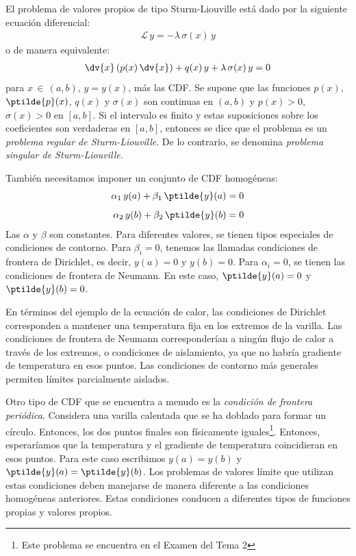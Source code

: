 El problema de valores propios de tipo Sturm-Liouville está dado por la siguiente ecuación diferencial:
\begin{align*}
\mathcal{L} \, y = - \lambda \, \sigma(x) \, y
\end{align*}
o de manera equivalente:
\begin{align}
\dv{x} \left( p(x) \, \dv{x} \right) + q(x) \, y + \lambda \, \sigma (x) \, y = 0
\label{eq:ecuacion_04_03}
\end{align}
para $x \, \in \, (a, b)$, $y = y (x)$, más las CDF. Se supone que las funciones $p (x)$, $\ptilde{p} (x)$, $q (x)$ y $\sigma (x)$ son continuas en $(a, b)$ y $p (x) > 0$, $\sigma (x) > 0$ en $[a , b]$. Si el intervalo es finito y estas suposiciones sobre los coeficientes son verdaderas en $[a, b]$, entonces se dice que el problema es un \emph{problema regular de Sturm-Liouville}. De lo contrario, se denomina \emph{problema singular de Sturm-Liouville}.
\par
También necesitamos imponer un conjunto de CDF homogéneas:
\begin{align}
\begin{aligned}
\alpha_{1} \, y(a) + \beta_{1} \, \ptilde{y} (a) &= 0 \\[0.5em]
\alpha_{2} \, y(b) + \beta_{2} \, \ptilde{y} (b) &= 0
\end{aligned}
\label{eq:ecuacion_04_04}
\end{align}
Las $\alpha$ y $\beta$ son constantes. Para diferentes valores, se tienen tipos especiales de condiciones de contorno. Para $\beta_{i} = 0$, tenemos las llamadas condiciones de frontera de Dirichlet, es decir, $y (a) = 0$ y $y (b) = 0$. Para $\alpha_{i} = 0$, se tienen las condiciones de frontera de Neumann. En este caso, $\ptilde{y} (a) = 0$ y $\ptilde{y} (b) = 0$.
\par
En términos del ejemplo de la ecuación de calor, las condiciones de Dirichlet corresponden a mantener una temperatura fija en los extremos de la varilla. Las condiciones de frontera de Neumann corresponderían a ningún flujo de calor a través de los extremos, o condiciones de aislamiento, ya que no habría gradiente de temperatura en esos puntos. Las condiciones de contorno más generales permiten límites parcialmente aislados.
\par
Otro tipo de CDF que se encuentra a menudo es la \emph{condición de frontera periódica}. Considera una varilla calentada que se ha doblado para formar un círculo. Entonces, los dos puntos finales son físicamente iguales\footnote{Este problema se encuentra en el Examen del Tema 2}. Entonces, esperaríamos que la temperatura y el gradiente de temperatura coincidieran en esos puntos. Para este caso escribimos $y (a) = y (b)$ y $\ptilde{y} (a) = \ptilde{y} (b)$. Los problemas de valores límite que utilizan estas condiciones deben manejarse de manera diferente a las condiciones homogéneas anteriores. Estas condiciones conducen a diferentes tipos de funciones propias y valores propios.
